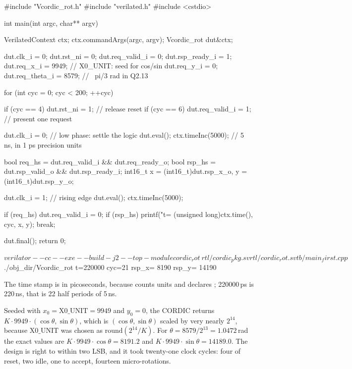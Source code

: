 \begin{cppcode}[caption={\file{main\_first.cpp}: the smallest useful Verilator testbench},label={lst:verilator:first}]
#include "Vcordic_rot.h"
#include "verilated.h"
#include <cstdio>

int main(int argc, char** argv) {
    VerilatedContext ctx;
    ctx.commandArgs(argc, argv);
    Vcordic_rot dut{&ctx};

    dut.clk_i = 0;
    dut.rst_ni = 0;
    dut.req_valid_i = 0;
    dut.rsp_ready_i = 1;
    dut.req_x_i = 9949;      // X0_UNIT: seed for cos/sin
    dut.req_y_i = 0;
    dut.req_theta_i = 8579;  // ~pi/3 rad in Q2.13

    for (int cyc = 0; cyc < 200; ++cyc) {
        if (cyc == 4) dut.rst_ni = 1;      // release reset
        if (cyc == 6) dut.req_valid_i = 1; // present one request

        dut.clk_i = 0;                     // low phase: settle the logic
        dut.eval();
        ctx.timeInc(5000);                 // 5 ns, in 1 ps precision units

        bool req_hs = dut.req_valid_i && dut.req_ready_o;
        bool rsp_hs = dut.rsp_valid_o && dut.rsp_ready_i;
        int16_t x = (int16_t)dut.rsp_x_o, y = (int16_t)dut.rsp_y_o;

        dut.clk_i = 1;                     // rising edge
        dut.eval();
        ctx.timeInc(5000);

        if (req_hs) dut.req_valid_i = 0;
        if (rsp_hs) {
            printf("t=%
                   (unsigned long)ctx.time(), cyc, x, y);
            break;
        }
    }
    dut.final();
    return 0;
}
\end{cppcode}

\begin{shcode}
$ verilator --cc --exe --build -j 2 --top-module cordic_rot \
      rtl/cordic_pkg.sv rtl/cordic_rot.sv tb/main_first.cpp
$ ./obj_dir/Vcordic_rot
t=220000 cyc=21  rsp_x=  8190  rsp_y= 14190
\end{shcode}

The time stamp is in picoseconds, because  counts
\code{timeprecision} units and \file{cordic\_rot.sv} declares
; 220000\,ps is 220\,ns, that is 22 half periods of
5\,ns.

Seeded with $x_0 = \mathrm{X0\_UNIT} = 9949$ and $y_0 = 0$, the CORDIC returns
$K \cdot 9949 \cdot (\cos\theta, \sin\theta)$, which is
$(\cos\theta, \sin\theta)$ scaled by very nearly $2^{14}$, because
$\mathrm{X0\_UNIT}$ was chosen as $\mathrm{round}(2^{14}/K)$. For $\theta =
8579/2^{13} = 1.0472$\,rad the exact values are $K \cdot 9949 \cdot \cos\theta
= 8191.2$ and $K \cdot 9949 \cdot \sin\theta = 14189.0$. The design is right to
within two LSB, and it took twenty-one clock cycles: four of reset, two idle,
one to accept, fourteen micro-rotations.

